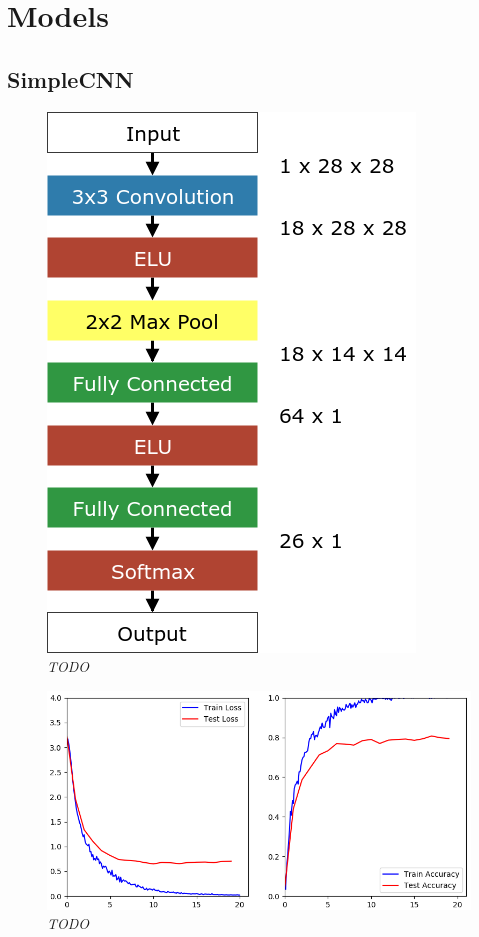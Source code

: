 \documentclass[a4paper]{article}
\begin{document}
\section{Models}
\subsection{SimpleCNN}
\begin{figure}
     \centering
     \includegraphics[height=0.7\linewidth]{graphics/nets/SimpleCNN}
     \caption{\textit{TODO}}
     \label{fig:simpleCNN}
\end{figure}

\begin{figure}
     \centering
     \includegraphics[width=.9\linewidth]{graphics/nets/SimpleCNN_Results}
     \caption{\textit{TODO}}
     \label{fig:simpleCNN_results}
\end{figure}
\end{document}
